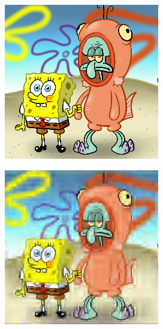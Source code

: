 \pagebreak
\begin{figure}
	\centering
	\begin{subfigure}[t]{0.32\textwidth}
	\includegraphics[width=\linewidth]{plaatjes/spongebob.jpg}
	\end{subfigure}
	\begin{subfigure}[t]{0.32\textwidth}
	\includegraphics[width=\linewidth]{plaatjes/spongebob_db2_0_025.jpg}

\end{subfigure}
\end{figure}
